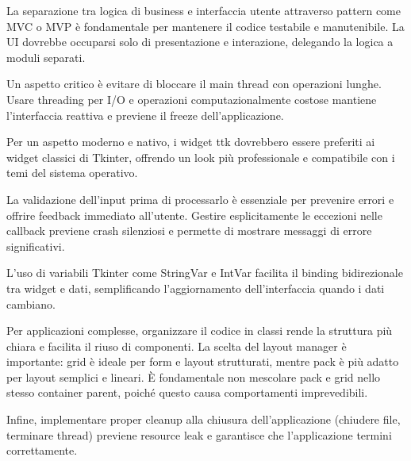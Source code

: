 \begin{tcolorbox}[title=Best Practices]
La separazione tra logica di business e interfaccia utente attraverso pattern come MVC o MVP è fondamentale per mantenere il codice testabile e manutenibile. La UI dovrebbe occuparsi solo di presentazione e interazione, delegando la logica a moduli separati.

Un aspetto critico è evitare di bloccare il main thread con operazioni lunghe. Usare threading per I/O e operazioni computazionalmente costose mantiene l'interfaccia reattiva e previene il freeze dell'applicazione.

Per un aspetto moderno e nativo, i widget ttk dovrebbero essere preferiti ai widget classici di Tkinter, offrendo un look più professionale e compatibile con i temi del sistema operativo.

La validazione dell'input prima di processarlo è essenziale per prevenire errori e offrire feedback immediato all'utente. Gestire esplicitamente le eccezioni nelle callback previene crash silenziosi e permette di mostrare messaggi di errore significativi.

L'uso di variabili Tkinter come StringVar e IntVar facilita il binding bidirezionale tra widget e dati, semplificando l'aggiornamento dell'interfaccia quando i dati cambiano.

Per applicazioni complesse, organizzare il codice in classi rende la struttura più chiara e facilita il riuso di componenti. La scelta del layout manager è importante: grid è ideale per form e layout strutturati, mentre pack è più adatto per layout semplici e lineari. È fondamentale non mescolare pack e grid nello stesso container parent, poiché questo causa comportamenti imprevedibili.

Infine, implementare proper cleanup alla chiusura dell'applicazione (chiudere file, terminare thread) previene resource leak e garantisce che l'applicazione termini correttamente.
\end{tcolorbox}

